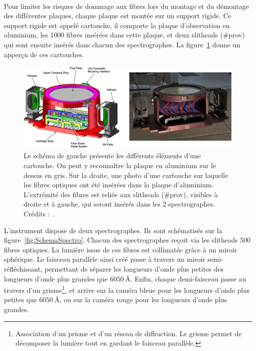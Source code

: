 \paragraph{} Pour limiter les risques de dommage aux fibres lors du montage et du démontage des différentes plaques, chaque plaque est montée sur un support rigide. Ce support rigide est appelé cartouche, il comporte la plaque d'observation en aluminium, les \num{1000} fibres insérées dans cette plaque, et deux slitheads (\#prov) qui sont ensuite insérés dans chacun des spectrographes. La figure~\ref{fig:CartoucheImage} donne un apperçu de ces cartouches.\\
\begin{figure}
  \centering
  \includegraphics[scale=0.35]{CartoucheImage}
  \caption{Le schéma de gauche présente les différents éléments d'une cartouche. On peut y reconnaître la plaque en aluminium sur le dessus en gris. Sur la droite, une photo d'une cartouche sur laquelle les fibres optiques ont été insérées dans la plaque d'aluminium. L'extrémité des fibres est reliée aux slitheads (\#prov), visibles à droite et à gauche, qui seront insérés dans les 2 spectrographes. Crédits :~\cite{Smee2012}.}
  \label{fig:CartoucheImage}
\end{figure}
L'instrument dispose de deux spectrographes. Ils sont schématisés sur la figure~\ref{fig:SchemaSpectro}. Chacun des spectrographes reçoit via les slitheads \num{500} fibres optiques. La lumière issue de ces fibres est collimatée grâce à un miroir sphérique. Le faisceau parallèle ainsi créé passe à travers un miroir semi-réfléchissant, permettant de séparer les longueurs d'onde plus petites des longueurs d'onde plus grandes que $\SI{6050}{\angstrom}$. Enfin, chaque demi-faisceau passe au travers d'un grisme\footnote{Association d'un prisme et d'un réseau de diffraction. Le grisme permet de décomposer la lumière tout en gardant le faisceau parallèle.}, et arrive sur la caméra bleue pour les longueurs d'onde plus petites que $\SI{6050}{\angstrom}$, ou sur la caméra rouge pour les longueurs d'onde plus grandes. 

